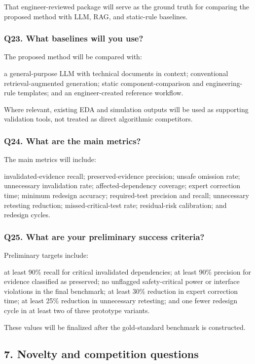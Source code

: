 \documentclass[12pt,letterpaper]{article}
\begin{document}
That engineer-reviewed package will serve as the ground truth for comparing the proposed method with LLM, RAG, and static-rule baselines.

\subsubsection{Q23. What baselines will you use?}

The proposed method will be compared with:

a general-purpose LLM with technical documents in context;
conventional retrieval-augmented generation;
static component-comparison and engineering-rule templates; and
an engineer-created reference workflow.

Where relevant, existing EDA and simulation outputs will be used as supporting validation tools, not treated as direct algorithmic competitors.

\subsubsection{Q24. What are the main metrics?}

The main metrics will include:

invalidated-evidence recall;
preserved-evidence precision;
unsafe omission rate;
unnecessary invalidation rate;
affected-dependency coverage;
expert correction time;
minimum redesign accuracy;
required-test precision and recall;
unnecessary retesting reduction;
missed-critical-test rate;
residual-risk calibration;
and redesign cycles.
\subsubsection{Q25. What are your preliminary success criteria?}

Preliminary targets include:

at least 90\% recall for critical invalidated dependencies;
at least 90\% precision for evidence classified as preserved;
no unflagged safety-critical power or interface violations in the final benchmark;
at least 30\% reduction in expert correction time;
at least 25\% reduction in unnecessary retesting;
and one fewer redesign cycle in at least two of three prototype variants.

These values will be finalized after the gold-standard benchmark is constructed.

\subsection{7. Novelty and competition questions}
\end{document}
